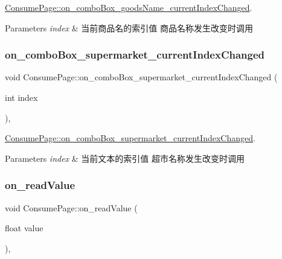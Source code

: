 \mbox{\hyperlink{class_consume_page_af5d7e2bc17a792db28f9e1dd205574e2}{Consume\+Page\+::on\+\_\+combo\+Box\+\_\+goods\+Name\+\_\+current\+Index\+Changed}}. 


\begin{DoxyParams}{Parameters}
{\em index} & 当前商品名的索引值 商品名称发生改变时调用 \\
\hline
\end{DoxyParams}
\mbox{\label{class_consume_page_a2456c0a7ad27aa1d991c4a2d9a3334e1}} 
\subsubsection{\texorpdfstring{on\_comboBox\_supermarket\_currentIndexChanged}{on\_comboBox\_supermarket\_currentIndexChanged}}
{\footnotesize\ttfamily void Consume\+Page\+::on\+\_\+combo\+Box\+\_\+supermarket\+\_\+current\+Index\+Changed (\begin{DoxyParamCaption}\item[{int}]{index }\end{DoxyParamCaption})\hspace{0.3cm}{\ttfamily [private]}, {\ttfamily [slot]}}



\mbox{\hyperlink{class_consume_page_a2456c0a7ad27aa1d991c4a2d9a3334e1}{Consume\+Page\+::on\+\_\+combo\+Box\+\_\+supermarket\+\_\+current\+Index\+Changed}}. 


\begin{DoxyParams}{Parameters}
{\em index} & 当前文本的索引值 超市名称发生改变时调用 \\
\hline
\end{DoxyParams}
\mbox{\label{class_consume_page_aee88a9a496e88620383622b4ab20e4c9}} 
\subsubsection{\texorpdfstring{on\_readValue}{on\_readValue}}
{\footnotesize\ttfamily void Consume\+Page\+::on\+\_\+read\+Value (\begin{DoxyParamCaption}\item[{float}]{value }\end{DoxyParamCaption})\hspace{0.3cm}{\ttfamily [private]}, {\ttfamily [slot]}}



